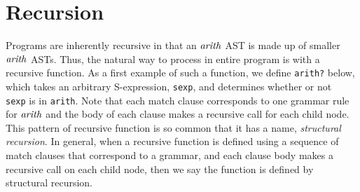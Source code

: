\documentclass[12pt]{book}
\begin{document}



\section{Recursion}
\label{sec:recursion}

Programs are inherently recursive in that an $\mathit{arith}$ AST is made
up of smaller $\mathit{arith}$ ASTs. Thus, the natural way to process in
entire program is with a recursive function.  As a first example of
such a function, we define \texttt{arith?} below, which takes an
arbitrary S-expression, {\tt sexp}, and determines whether or not {\tt
  sexp} is in {\tt arith}. Note that each match clause corresponds to
one grammar rule for $\mathit{arith}$ and the body of each clause makes a
recursive call for each child node. This pattern of recursive function
is so common that it has a name, \emph{structural recursion}.  In
general, when a recursive function is defined using a sequence of
match clauses that correspond to a grammar, and each clause body makes
a recursive call on each child node, then we say the function is
defined by structural recursion.
\end{document}

